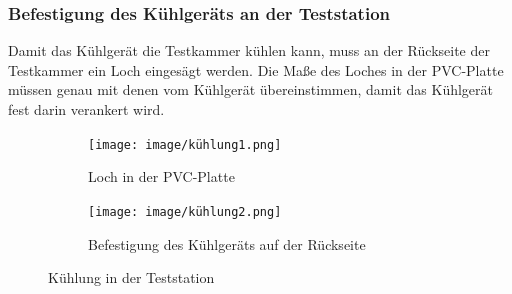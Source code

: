 \subsubsection{Befestigung des Kühlgeräts an der Teststation}

Damit das Kühlgerät die Testkammer kühlen kann, muss an der Rückseite der Testkammer ein Loch eingesägt werden. Die Maße des Loches in der PVC-Platte müssen genau mit denen vom Kühlgerät übereinstimmen, damit das Kühlgerät fest darin verankert wird.\\
\vspace{3mm}

\vspace{3mm}


\begin{figure}[H]
	\centering
	\begin{subfigure}[b]{0.5\textwidth}
		\centering
		\texttt{[image: image/kühlung1.png]}
		\caption{Loch in der PVC-Platte}
		\label{fig:bild1}
	\end{subfigure}
	\hfill
	\begin{subfigure}[b]{0.5\textwidth}
		\centering
		\texttt{[image: image/kühlung2.png]}
		\caption{Befestigung des Kühlgeräts auf der Rückseite}
		\label{fig:bild2}
	\end{subfigure}
	\caption{Kühlung in der Teststation}
	\label{fig:zwei_bilder}
\end{figure}
